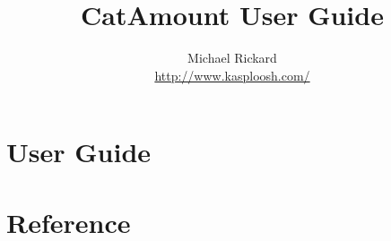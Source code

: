 \documentclass[12pt,letterpaper,oneside,openany]{book}
\begin{document}
\title{CatAmount User Guide}
\author{Michael Rickard\\
  \url{http://www.kasploosh.com/}}
\maketitle

\tableofcontents

\part{User Guide}













\part{Reference}







\end{document}

